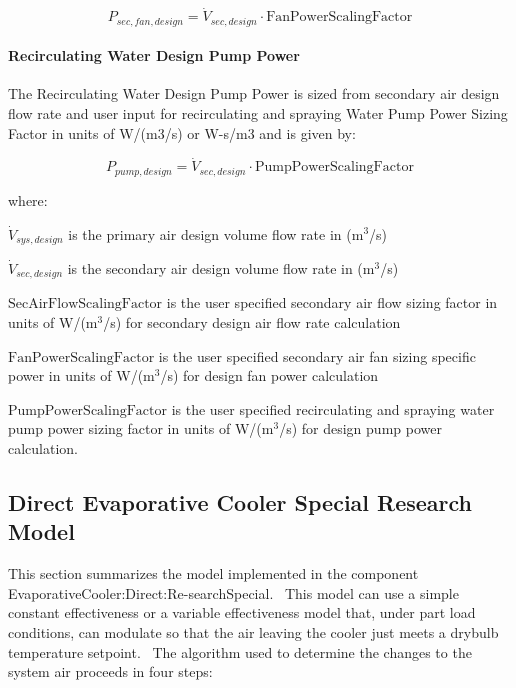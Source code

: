 \begin{equation}
P_{sec,fan,design} = \dot{V}_{sec,design}\cdot\text{FanPowerScalingFactor}
\end{equation}

\paragraph{Recirculating Water Design Pump Power}\label{recirculating-water-design-pump-power}

The Recirculating Water Design Pump Power is sized from secondary air design flow rate and user input for recirculating and spraying Water Pump Power Sizing Factor in units of W/(m3/s) or W-s/m3 and is given by:

\begin{equation}
P_{pump,design} = \dot{V}_{sec,design}\cdot\text{PumpPowerScalingFactor}
\end{equation}

where:

\(\dot{V}_{sys,design}\) is the primary air design volume flow rate in (m\(^{3}\)/s)

\(\dot{V}_{sec,design}\) is the secondary air design volume flow rate in (m\(^{3}\)/s)

\(\text{SecAirFlowScalingFactor}\) is the user specified secondary air flow sizing factor in units of W/(m\(^{3}\)/s) for secondary design air flow rate calculation

\(\text{FanPowerScalingFactor}\) is the user specified secondary air fan sizing specific power in units of W/(m\(^{3}\)/s) for design fan power calculation

\(\text{PumpPowerScalingFactor}\) is the user specified recirculating and spraying water pump power sizing factor in units of W/(m\(^{3}\)/s) for design pump power calculation.

\subsection{Direct Evaporative Cooler Special Research Model}\label{direct-evaporative-cooler-special-research-model}

This section summarizes the model implemented in the component EvaporativeCooler:Direct:Re-searchSpecial.~ This model can use a simple constant effectiveness or a variable effectiveness model that, under part load conditions, can modulate so that the air leaving the cooler just meets a drybulb temperature setpoint.~ The algorithm used to determine the changes to the system air proceeds in four steps:

